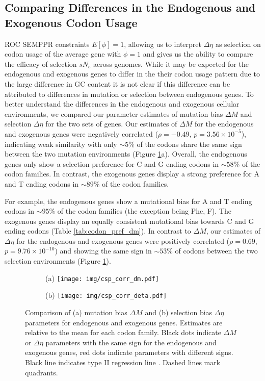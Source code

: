 \documentclass[doublespacing,linenumbers]{bmcart}
\newcommand{\ROC}{ROC SEMPPR\xspace}
\newcommand{\GC}{GC content\xspace}
\newcommand{\DM}{\ensuremath{{\Delta M}}\xspace}
\newcommand{\DE}{\ensuremath{{\Delta \eta}}\xspace}
\newcommand{\Ne}{\ensuremath{N_e}\xspace}
\begin{document}
\subsection*{Comparing Differences in the Endogenous and Exogenous Codon Usage}
\ROC constraints $E[\phi] = 1$, allowing us to interpret \DE as selection on codon usage of the average gene with $\phi = 1$ and gives us the ability to compare the efficacy of selection $s\Ne$  across genomes.
While it may be expected for the endogenous and exogenous genes to differ in the their codon usage pattern due to the large difference in \GC it is not clear if this difference can be attributed to differences in mutation or selection between endogenous genes.
To better understand the differences in the endogenous and exogenous cellular environments, we compared our parameter estimates of mutation bias \DM and selection \DE for the two sets of genes.
Our estimates of \DM for the endogenous and exogenous genes were negatively correlated ($\rho = -0.49$, $p = 3.56\times10^{-5}$),  indicating weak similarity with only $\sim5\%$ of the codons share the same sign between the two mutation environments (Figure \ref{fig:csp_comp}a).
Overall, the endogenous genes only show a selection preference for C and G ending codons in $\sim58\%$ of the codon families.
In contrast, the exogenous genes display a strong preference for A and T ending codons in $\sim89\%$ of the codon families.

For example, the endogenous genes show a mutational bias for A and T ending codons in $\sim95\%$ of the codon families (the exception being Phe, F).
The exogenous genes display an equally consistent mutational bias towards C and G ending codons (Table \ref{tab:codon_pref_dm}).
In contrast to \DM, our estimates of \DE for the endogenous and exogenous genes were positively correlated ($\rho = 0.69$, $p = 9.76\times10^{-10}$) and showing the same sign in $\sim53\%$ of codons between the two selection environments (Figure \ref{fig:csp_comp}).

\begin{figure}
    \centering
    \begin{subfigure}
        \centering
        (a) \texttt{[image: img/csp\_corr\_dm.pdf]}
    \end{subfigure}
    \begin{subfigure}
        \centering
        (b) \texttt{[image: img/csp\_corr\_deta.pdf]}
    \end{subfigure}
    \caption{Comparison of (a) mutation bias \DM and (b) selection bias \DE parameters for endogenous and exogenous genes.
      Estimates are relative to the mean for each codon family.
      Black dots indicate \DM or \DE parameters with the same sign for the endogenous and exogenous genes, red dots indicate parameters with different signs.
      Black line indicates type II regression line \citep{SokalAndRohlf1981}.
      Dashed lines mark quadrants.}
    \label{fig:csp_comp}
\end{figure}
\end{document}
